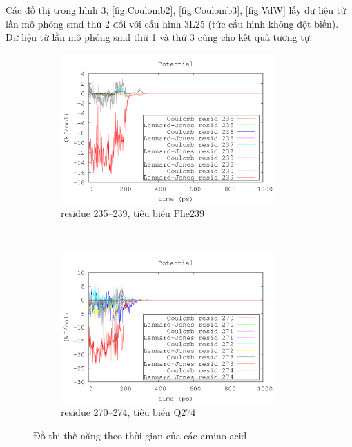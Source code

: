 \documentclass[12pt,a4paper,reqno, oneside]{book}
\begin{document}
Các đồ thị trong hình \ref{fig:Coulomb1}, \ref{fig:Coulomb2}, \ref{fig:Coulomb3}, \ref{fig:VdW} lấy dữ liệu từ lần mô phỏng \gls{smd} thứ 2 đối với cấu hình 3L25 (tức cấu hình không đột biến). Dữ liệu từ lần mô phỏng \gls{smd} thứ 1 và thứ 3 cũng cho kết quả tương tự.


\begin{figure}[h!]
\begin{subfigure}{\textwidth}
\includegraphics[width=0.9\textwidth,natwidth=610,natheight=642]{235-239}
\caption{\gls{residue} 235--239, tiêu biểu Phe239}
\label{fig:239}
\end{subfigure}\\
\begin{subfigure}{\textwidth}
\includegraphics[width=0.9\textwidth,natwidth=610,natheight=642]{270-274}
\caption{\gls{residue} 270--274, tiêu biểu Q274}
\label{fig:274}
\end{subfigure}
\caption{Đồ thị thế năng theo thời gian của các amino acid}
\label{fig:Coulomb1}
\end{figure}
\end{document}
